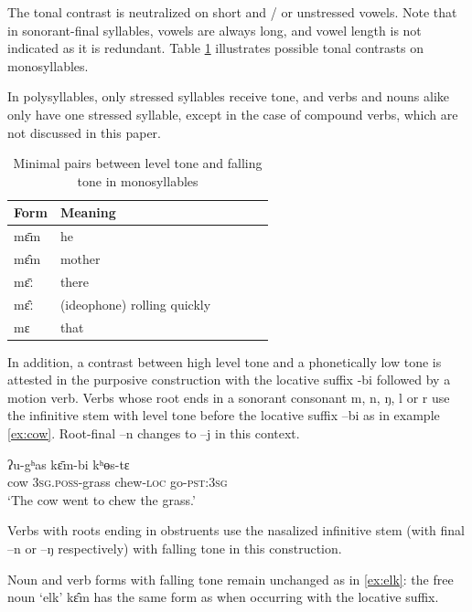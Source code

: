 \documentclass[oldfontcommands,oneside,a4paper,11pt]{article}
\newcommand{\ipa}[1]{{\phon \mbox{#1}}} %
\begin{document}
 The tonal contrast is neutralized  on short  and / or unstressed vowels. Note that in sonorant-final syllables, vowels are always long, and vowel length is not indicated as it is redundant. Table \ref{tab:minimal.pairs} illustrates possible tonal contrasts on monosyllables.  

In polysyllables, only stressed syllables receive tone, and verbs and nouns alike only have one stressed syllable, except in the case of compound verbs, which are not discussed in this paper.

\begin{table}[H]
\caption{Minimal pairs between level tone and falling tone in monosyllables } \label{tab:minimal.pairs}\centering
\begin{tabular}{llllll}
\toprule
Form & Meaning\\
\midrule
\ipa{mɛ̄m} & he \\
\ipa{mɛ̂m} & mother\\
\midrule
\ipa{mɛ̄ː} & there\\
\ipa{mɛ̂ː} & (ideophone) rolling quickly \\
\ipa{mɛ} & that\\
\bottomrule
\end{tabular}
\end{table}

In addition, a contrast between high level tone and a phonetically low tone is attested in the purposive construction with the locative suffix \ipa{-bi} followed by a motion verb. Verbs  whose root ends in a sonorant consonant \ipa{m}, \ipa{n}, \ipa{ŋ}, \ipa{l} or \ipa{r} use the infinitive stem with level tone before the locative suffix \ipa{--bi} as in example \ref{ex:cow}. Root-final   \ipa{--n} changes to \ipa{--j} in this context. 

\begin{exe}
\ex \label{ex:cow}
\gll \ipa{bʌ̂j} \ipa{ʔu-gʰas} \ipa{kɛ̄m-bi} \ipa{kʰɵs-tɛ}  \\
cow \textsc{3sg.poss}-grass chew-\textsc{loc} go-\textsc{pst:3sg} \\
\glt `The cow went to chew the grass.'
\end{exe}

Verbs with roots ending in obstruents use the nasalized infinitive stem (with final \ipa{--n} or \ipa{--ŋ} respectively) with falling tone in this construction.

Noun  and verb forms with falling tone  remain unchanged as in \ref{ex:elk}: the free noun `elk' \ipa{kɛ̂m} has the same form as when occurring with the locative suffix.
\end{document}
